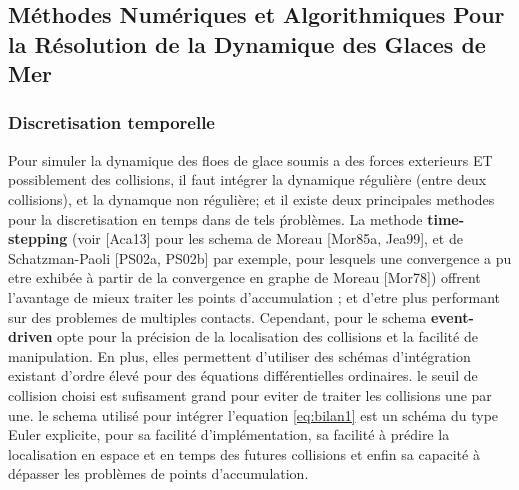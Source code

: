 \subsection{Méthodes Numériques et Algorithmiques Pour la Résolution de la Dynamique des Glaces de Mer}
 
\subsubsection{Discretisation temporelle}

Pour simuler la dynamique des floes de glace soumis a des forces exterieurs ET possiblement des collisions, il faut intégrer la dynamique régulière (entre deux collisions), et la dynamque non régulière; et il existe deux principales methodes pour la discretisation en temps dans de tels ṕroblèmes. La methode \textbf{time-stepping} (voir [Aca13] pour les schema de Moreau [Mor85a, Jea99], et de Schatzman-Paoli [PS02a, PS02b] par exemple, pour lesquels une convergence a pu etre exhibée à partir de la convergence en graphe de Moreau [Mor78]) offrent l'avantage de mieux traiter les points d'accumulation \parencite{rabatel2015thesis}; et d'etre plus performant sur des problemes de multiples contacts. Cependant, \citeauthor{rabatel2015thesis} pour le schema \textbf{event-driven} opte pour la précision de la localisation des collisions et la facilité de manipulation. En plus, elles permettent d’utiliser des schémas d’intégration existant d’ordre élevé pour des équations différentielles ordinaires. le seuil de collision choisi est sufisament grand pour eviter de traiter les collisions une par une. le schema utilisé pour intégrer l'equation \cref{eq:bilan1} est un schéma du type Euler explicite, pour sa facilité d’implémentation, sa facilité à prédire la localisation en espace et en temps des futures collisions et enfin sa capacité à dépasser les problèmes de points d’accumulation. 

